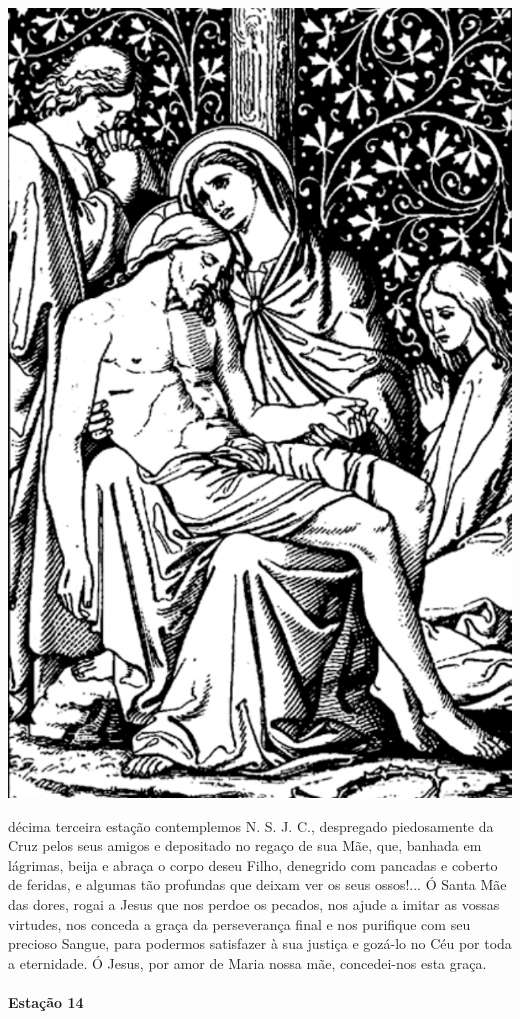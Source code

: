 \begin{nscenter}
\includegraphics[width=.75\textwidth, height=.75\textheight, keepaspectratio]{media/station13}
\end{nscenter}

 décima terceira estação contemplemos N. S. J. C., despregado piedosamente da Cruz pelos seus amigos e depositado no regaço de sua Mãe, que, banhada em lágrimas, beija e abraça o corpo deseu Filho, denegrido com pancadas e coberto de feridas, e algumas tão profundas que deixam ver os seus ossos!...
Ó Santa Mãe das dores, rogai a Jesus que nos perdoe os pecados, nos ajude a imitar as vossas virtudes, nos conceda a graça da perseverança final e nos purifique com seu precioso Sangue, para podermos satisfazer à sua justiça e gozá-lo no Céu por toda a eternidade. Ó Jesus, por amor de Maria nossa mãe, concedei-nos esta graça.

\newpage

\paragraph{Estação 14}

